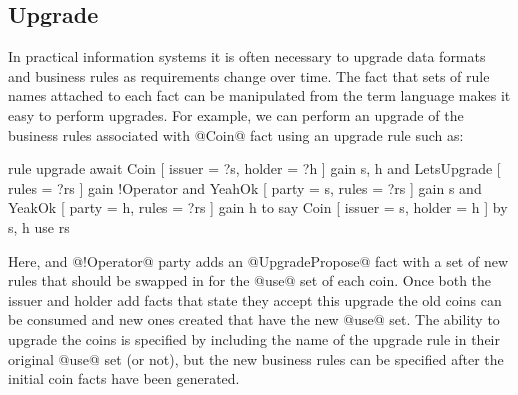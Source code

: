 



\subsection{Upgrade}
\label{s:Upgrade}
In practical information systems it is often necessary to upgrade data formats and business rules as requirements change over time. The fact that sets of rule names attached to each fact can be manipulated from the term language makes it easy to perform upgrades. For example, we can perform an upgrade of the business rules associated with @Coin@ fact using an upgrade rule such as:

\begin{small}
\begin{code}
  rule  upgrade
  await Coin [ issuer = ?s, holder = ?h ]  gain {s, h}
    and LetsUpgrade [ rules = ?rs ]     gain {!Operator}
    and YeahOk      [ party = s, rules = ?rs ] gain {s}
    and YeakOk      [ party = h, rules = ?rs ] gain {h}
   to
    say Coin [ issuer = s, holder = h ]
     by {s, h} use rs
\end{code}
\end{small}

Here, and @!Operator@ party adds an @UpgradePropose@ fact with a set of new rules that should be swapped in for the @use@ set of each coin. Once both the issuer and holder add facts that state they accept this upgrade the old coins can be consumed and new ones created that have the new @use@ set. The ability to upgrade the coins is specified by including the name of the upgrade rule in their original @use@ set (or not), but the new business rules can be specified after the initial coin facts have been generated.



